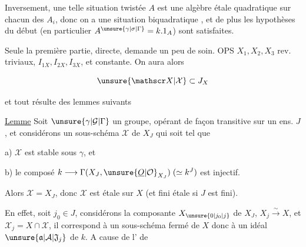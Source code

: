 
Inversement,  une telle situation twistée $A$ est une algèbre étale quadratique sur chacun des $A_i$, donc on a une situation biquadratique , et de plus les hypothèses du début (en particulier $A^{\unsure{\gamma|\sigma|\Gamma}}=k.1_A$) sont satisfaites.

 Seule la première partie, directe, demande un peu de soin. OPS $X_1,X_2,X_3$ rev. triviaux, $I_{1X},I_{2X},I_{3X}$, et   constante.  On aura alors

\[
 \unsure{\mathscr X|\mathcal X}\subset J_X
\]

et tout résulte des lemmes suivants

\uline{Lemme} Soit $\unsure{\gamma|\mathcal G|\Gamma}$ un groupe, opérant de façon transitive sur un ens. $J$, et considérons un sous-schéma $\mathscr X$ de $X_J$  qui soit tel que

a) $\mathscr X$ est stable sous $\gamma$, et

b) le composé $k\longrightarrow\Gamma(X_J,\unsure{\underline O|\mathcal O}_{X_J})\;(\simeq k^J)$ est injectif.

Alors $\mathscr X=X_J$, donc $\mathscr X$ est étale sur $X$ (et fini étale si $J$ est fini).

En effet, soit $j_0\in J$, considérons la composante $X_{\unsure{0|j_0|j}}$ de $X_J$, $X_j\xrightarrow{\sim}X$, et $\mathscr X_j=X\cap\mathscr X$, il correspond à un sous-schéma fermé de $X$ donc à un idéal $\unsure{\mathfrak a|\mathcal A|\mathfrak J_j}$ de $k$. A cause de l' de


